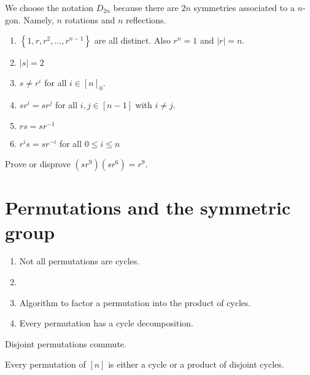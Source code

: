 \documentclass[11pt,a4paper]{article}
\begin{document}
\begin{rem}
    We choose the notation \(D_{2n}\) because there are \(2n\) symmetries associated to a \(n\)-gon. Namely, \(n\) rotations and \(n\) reflections.
\end{rem}

\begin{teo}
\begin{enumerate}[label=(\roman*)]
    \item \(\left\{ 1,r,r^2,\ldots,r^{n-1} \right\}\) are all distinct. Also  \(r^n = 1\) and \(|r| = n\).
    \item \(|s| =2\)
    \item \(s\neq r^i\) for all \(i\in [n]_0\).
    \item \(sr^i = sr^j \) for all \(i,j\in [n-1]\) with \(i\neq j\).
    \item \(rs = sr^{-1}\)
    \item \(r^i s = sr^{-i}\) for all \(0\leq i\leq n\)
\end{enumerate}
\end{teo}

\begin{eje}
    Prove or disprove \((sr^9) (sr^6) = r^9\).
\end{eje}


\section{Permutations and the symmetric group}


\begin{rem}
    \begin{enumerate}[label=(\roman*)]
        \item Not all permutations are cycles.
        \item 
        \item Algorithm to factor a permutation into the product of cycles.
        \item Every permutation has a cycle decomposition.
    \end{enumerate}
\end{rem}


\begin{defi}
    
\end{defi}


\begin{lem}
    Disjoint permutations commute.
\end{lem}


\begin{lem}
    Every permutation of \([n]\) is either a cycle or a product of disjoint cycles.
\end{lem}


\paragraph{}
\end{document}
